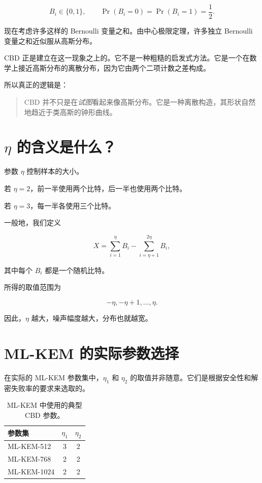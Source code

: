 \[
B_i \in \{0,1\}, \qquad \Pr(B_i=0)=\Pr(B_i=1)=\frac{1}{2}.
\]

现在考虑许多这样的 Bernoulli 变量之和。由中心极限定理，许多独立 Bernoulli 变量之和近似服从高斯分布。

CBD 正是建立在这一现象之上的。它不是一种粗糙的启发式方法。它是一个在数学上接近高斯分布的离散分布，因为它由两个二项计数之差构成。

所以真正的逻辑是：

\begin{quote}
CBD 并不只是在\textit{试图}看起来像高斯分布。它是一种离散构造，其形状自然地趋近于类高斯的钟形曲线。
\end{quote}

\section{\(\eta\) 的含义是什么？}

参数 \(\eta\) 控制样本的大小。

若 \(\eta=2\)，前一半使用两个比特，后一半也使用两个比特。

若 \(\eta=3\)，每一半各使用三个比特。

一般地，我们定义

\[
X = \sum_{i=1}^{\eta} B_i - \sum_{i=\eta+1}^{2\eta} B_i,
\]

其中每个 \(B_i\) 都是一个随机比特。

所得的取值范围为

\[
-\eta, -\eta+1, \dots, \eta.
\]

因此，\(\eta\) 越大，噪声幅度越大，分布也就越宽。

\section{ML-KEM 的实际参数选择}

在实际的 ML-KEM 参数集中，\(\eta_1\) 和 \(\eta_2\) 的取值并非随意。它们是根据安全性和解密失败率的要求来选取的。

\begin{table}[h]
\centering
\begin{tabular}{lcc}
\toprule
参数集 & \(\eta_1\) & \(\eta_2\) \\
\midrule
ML-KEM-512  & 3 & 2 \\
ML-KEM-768  & 2 & 2 \\
ML-KEM-1024 & 2 & 2 \\
\bottomrule
\end{tabular}
\caption{ML-KEM 中使用的典型 CBD 参数。}
\end{table}


